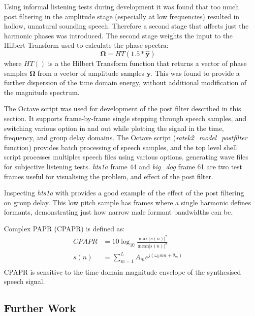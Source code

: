 \documentclass{article}
\begin{document}
Using informal listening tests during development it was found that too much post filtering in the amplitude stage (especially at low frequencies) resulted in hollow, unnatural sounding speech.  Therefore a second stage that affects just the harmonic phases was introduced. The second stage weights the input to the Hilbert Transform used to calculate the phase spectra:
\begin{equation}
\mathbf{\Omega}=HT(1.5*\hat{\mathbf{y}})
\end{equation}
where $HT()$ is a the Hilbert Transform function that returns a vector of phase samples $\mathbf{\Omega}$ from a vector of amplitude samples $\mathbf{y}$.  This was found to provide a further dispersion of the time domain energy, without additional modification of the magnitude spectrum.

The  Octave script was used for development of the post filter described in this section.  It supports frame-by-frame single stepping through speech samples, and switching various option in and out while plotting the signal in the time, frequency, and group delay domains.  The  Octave script (\emph{ratek2\_model\_postfilter} function) provides batch processing of speech samples, and the top level  shell script processes multiples speech files using various options, generating wave files for subjective listening tests. \emph{hts1a} frame 44 and \emph{big\_dog} frame 61 are two test frames useful for visualising the problem, and effect of the post filter.  

Inspecting \emph{hts1a} with  provides a good example of the effect of the post filtering on group delay.  This low pitch sample has frames where a single harmonic defines formants, demonstrating just how narrow male formant bandwidths can be.

Complex PAPR (CPAPR) is defined as:
\begin{equation}
\begin{split}
CPAPR &= 10\log_{10} \frac{ \max |s(n)|^2 }{ \textrm{mean} |s(n)|^2 } \\
s(n) &= \sum_{m=1}^{L}A_m e^{j(\omega_0mn+\theta_m)} \\
\end{split}
\end{equation}
CPAPR is sensitive to the time domain magnitude envelope of the synthesised speech signal.

\subsection{Further Work}
\end{document}
